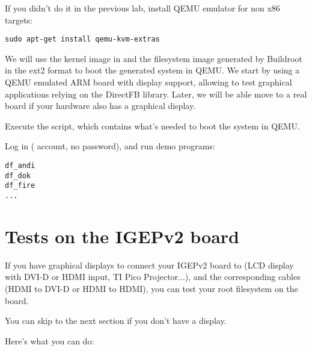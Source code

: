 If you didn't do it in the previous lab, install QEMU emulator for non
x86 targets:

\begin{verbatim}
sudo apt-get install qemu-kvm-extras
\end{verbatim}

We will use the kernel image in  and the filesystem image
generated by Buildroot in the ext2 format to boot the generated system
in QEMU. We start by using a QEMU emulated ARM board with display
support, allowing to test graphical applications relying on the
DirectFB library. Later, we will be able move to a real board if your
hardware also has a graphical display.

Execute the  script, which contains what's needed
to boot the system in QEMU.

Log in ( account, no password), and run demo programs:

\begin{verbatim}
df_andi
df_dok
df_fire
...
\end{verbatim}

\section{Tests on the IGEPv2 board}

If you have graphical displays to connect your IGEPv2 board to (LCD
display with DVI-D or HDMI input, TI Pico Projector...), and the
corresponding cables (HDMI to DVI-D or HDMI to HDMI), you can test
your root filesystem on the board.

You can skip to the next section if you don't have a display.

Here's what you can do:

